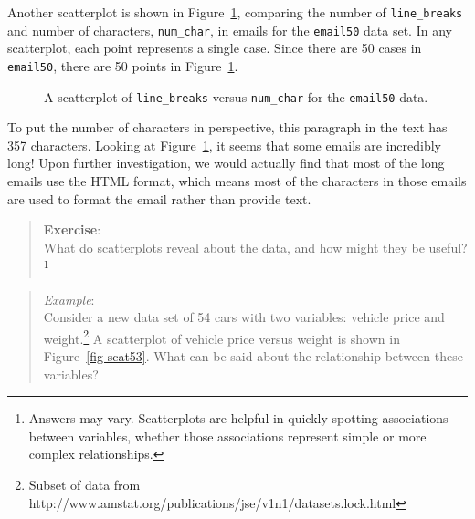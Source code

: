 \documentclass[
  letterpaper,
  DIV=11,
  numbers=noendperiod]{scrreprt}
\begin{document}
Another scatterplot is shown in Figure~\ref{fig-scat52}, comparing the
number of \texttt{line\_breaks} and number of characters,
\texttt{num\_char}, in emails for the \texttt{email50} data set. In any
scatterplot, each point represents a single case. Since there are 50
cases in \texttt{email50}, there are 50 points in
Figure~\ref{fig-scat52}.

\begin{figure}


\caption{\label{fig-scat52}A scatterplot of \texttt{line\_breaks} versus
\texttt{num\_char} for the \texttt{email50} data.}

\end{figure}%

To put the number of characters in perspective, this paragraph in the
text has 357 characters. Looking at Figure~\ref{fig-scat52}, it seems
that some emails are incredibly long! Upon further investigation, we
would actually find that most of the long emails use the HTML format,
which means most of the characters in those emails are used to format
the email rather than provide text.

\begin{quote}
\textbf{Exercise}:\\
What do scatterplots reveal about the data, and how might they be
useful?\footnote{Answers may vary. Scatterplots are helpful in quickly
  spotting associations between variables, whether those associations
  represent simple or more complex relationships.}
\end{quote}

\begin{quote}
\emph{Example}:\\
Consider a new data set of 54 cars with two variables: vehicle price and
weight.\footnote{Subset of data from
  http://www.amstat.org/publications/jse/v1n1/datasets.lock.html} A
scatterplot of vehicle price versus weight is shown in
Figure~\ref{fig-scat53}. What can be said about the relationship between
these variables?
\end{quote}
\end{document}
